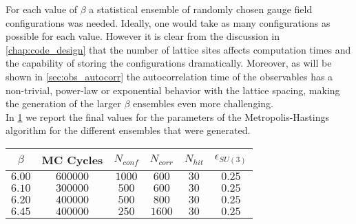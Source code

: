 For each value of $\beta$ a statistical ensemble of randomly chosen gauge field configurations was needed. Ideally, one would take as many configurations as possible for each value. However it is clear from the discussion in \cref{chap:code_design} that the number of lattice sites affects computation times and the capability of storing the configurations dramatically. Moreover, as will be shown in \cref{sec:obs_autocorr} the autocorrelation time of the observables has a non-trivial, power-law or exponential behavior with the lattice spacing, making the generation of the larger $\beta$ ensembles even more challenging.\\
In \cref{runs:mcparams} we report the final values for the parameters of the Metropolis-Hastings algorithm for the different ensembles that were generated.
\begin{table}[!htb]
    \begin{center}
    \begin{tabular}{cccccc}
        $\beta$ & MC Cycles & $N_{conf}$ & $N_{corr}$ &  $N_{hit}$ & $\epsilon_{SU(3)}$\\\hline
        $6.00$ & $600000$ & $1000$ & $600$ & $30$ & $0.25$\\
        $6.10$ & $300000$ & $500$ & $600$ & $30$ & $0.25$\\
        $6.20$ & $400000$ & $500$ & $800$ & $30$ & $0.25$\\
        $6.45$ & $400000$ & $250$ & $1600$ & $30$ & $0.25$
    \end{tabular}
    \label{runs:mcparams} 
    \end{center}
\end{table}

